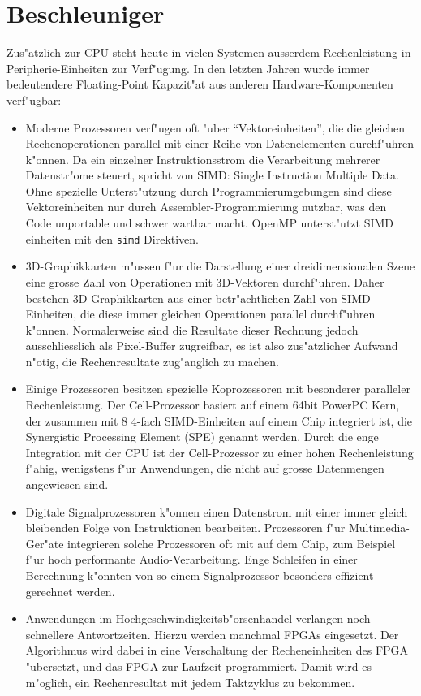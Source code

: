 \section{Beschleuniger\label{section-beschleuniger}}
Zus"atzlich zur CPU steht heute in vielen Systemen ausserdem Rechenleistung
in Peripherie-Einheiten zur Verf"ugung.
In den letzten Jahren wurde immer bedeutendere Floating-Point Kapazit"at 
aus anderen Hardware-Komponenten verf"ugbar:
\begin{itemize}
\item Moderne Prozessoren verf"ugen oft "uber ``Vektoreinheiten'', 
die die gleichen Rechenoperationen parallel mit einer Reihe von Datenelementen
durchf"uhren k"onnen.
Da ein einzelner Instruktionsstrom die Verarbeitung mehrerer Datenstr"ome
steuert, spricht von SIMD: Single Instruction Multiple Data.
Ohne spezielle Unterst"utzung durch Programmierumgebungen sind diese
Vektoreinheiten nur durch Assembler-Programmierung nutzbar, was den
Code unportable und schwer wartbar macht.
OpenMP unterst"utzt SIMD einheiten mit den {\tt simd} Direktiven.
\item 3D-Graphikkarten m"ussen f"ur die Darstellung einer dreidimensionalen
Szene eine grosse Zahl von Operationen mit 3D-Vektoren durchf"uhren. 
Daher bestehen 3D-Graphikkarten aus einer betr"achtlichen Zahl von
SIMD Einheiten,
die diese immer gleichen Operationen parallel durchf"uhren k"onnen. 
Normalerweise sind die Resultate dieser Rechnung jedoch ausschliesslich
als Pixel-Buffer zugreifbar, es ist also zus"atzlicher Aufwand
n"otig, die Rechenresultate zug"anglich zu machen.
\item Einige Prozessoren besitzen spezielle Koprozessoren mit besonderer
paralleler Rechenleistung. Der Cell-Prozessor basiert auf einem 64bit PowerPC
Kern, der zusammen mit 8 4-fach SIMD-Einheiten auf einem Chip integriert ist, 
die Synergistic Processing Element (SPE) genannt werden.
Durch die enge Integration mit der CPU ist der Cell-Prozessor zu einer hohen
Rechenleistung f"ahig, wenigstens f"ur Anwendungen, die nicht auf grosse
Datenmengen angewiesen sind.
\item Digitale Signalprozessoren k"onnen einen Datenstrom mit einer immer
gleich bleibenden Folge von Instruktionen bearbeiten. Prozessoren
f"ur Multimedia-Ger"ate integrieren solche Prozessoren oft mit auf dem
Chip, zum Beispiel f"ur hoch performante Audio-Verarbeitung. 
Enge Schleifen in einer Berechnung k"onnten von so einem Signalprozessor 
besonders effizient gerechnet werden.
\item Anwendungen im Hochgeschwindigkeitsb"orsenhandel verlangen noch
schnellere Antwortzeiten.
Hierzu werden manchmal FPGAs eingesetzt. Der Algorithmus wird dabei
in eine Verschaltung der Recheneinheiten des FPGA "ubersetzt, und das
FPGA zur Laufzeit programmiert.
Damit wird es m"oglich, ein Rechenresultat mit jedem Taktzyklus 
zu bekommen.
\end{itemize}

